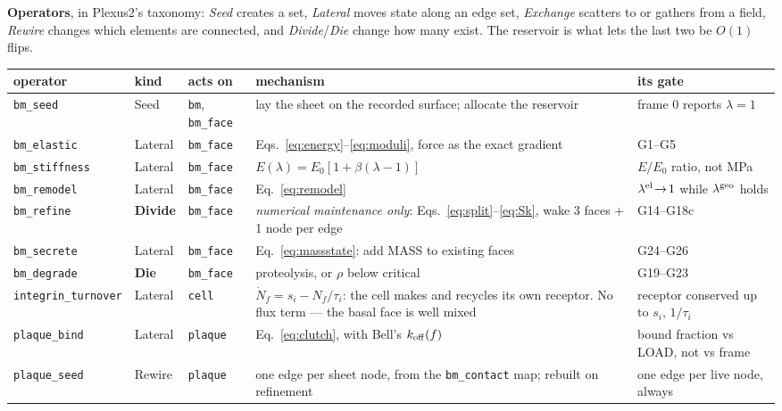 \documentclass[10pt,a4paper]{article}
\newcommand{\code}[1]{\texttt{#1}}
\newcommand{\op}[1]{\texttt{#1}}
\begin{document}
\textbf{Operators}, in Plexus2's taxonomy: \emph{Seed} creates a set, \emph{Lateral} moves state along
an edge set, \emph{Exchange} scatters to or gathers from a field, \emph{Rewire} changes which elements
are connected, and \emph{Divide}/\emph{Die} change how many exist. The reservoir is what lets the last
two be $O(1)$ flips.

\begin{center}\footnotesize
\begin{tabular}{@{}lllp{4.3cm}p{3.4cm}@{}}\toprule
\textbf{operator} & \textbf{kind} & \textbf{acts on} & \textbf{mechanism} & \textbf{its gate}\\\midrule
\op{bm\_seed}       & Seed    & \code{bm}, \code{bm\_face} & lay the sheet on the recorded surface;
  allocate the reservoir & frame 0 reports $\lambda=1$\\
\op{bm\_elastic}    & Lateral & \code{bm\_face} & Eqs.~\eqref{eq:energy}--\eqref{eq:moduli}, force as
  the exact gradient & G1--G5\\
\op{bm\_stiffness}  & Lateral & \code{bm\_face} & $E(\lambda)=E_0[1+\beta(\lambda-1)]$ & $E/E_0$ ratio,
  not MPa\\
\op{bm\_remodel}    & Lateral & \code{bm\_face} & Eq.~\eqref{eq:remodel} & $\lambda^{\rm el}\!\to\!1$
  while $\lambda^{\rm geo}$ holds\\
\op{bm\_refine}     & \textbf{Divide} & \code{bm\_face} & \emph{numerical maintenance only}:
  Eqs.~\eqref{eq:split}--\eqref{eq:Sk}, wake 3 faces + 1 node per edge & G14--G18c\\
\op{bm\_secrete}    & Lateral & \code{bm\_face} & Eq.~\eqref{eq:massstate}: add MASS to existing
  faces \cite{matsubayashi2020} & G24--G26\\
\op{bm\_degrade}    & \textbf{Die}    & \code{bm\_face} & proteolysis, or $\rho$ below critical
  \cite{kelley2019} & G19--G23\\
\op{integrin\_turnover} & Lateral & \code{cell} & $\dot N_f=s_i-N_f/\tau_i$: the cell makes and
  recycles its own receptor. No flux term --- the basal face is well mixed & receptor conserved up to
  $s_i$, $1/\tau_i$\\
\op{plaque\_bind}   & Lateral & \code{plaque}   & Eq.~\eqref{eq:clutch}, with Bell's $k_{\rm off}(f)$
  \cite{bell1978} & bound fraction vs LOAD, not vs frame\\
\op{plaque\_seed}   & Rewire  & \code{plaque}   & one edge per sheet node, from the \op{bm\_contact}
  map; rebuilt on refinement & one edge per live node, always\\

\end{tabular}
\end{center}
\end{document}
